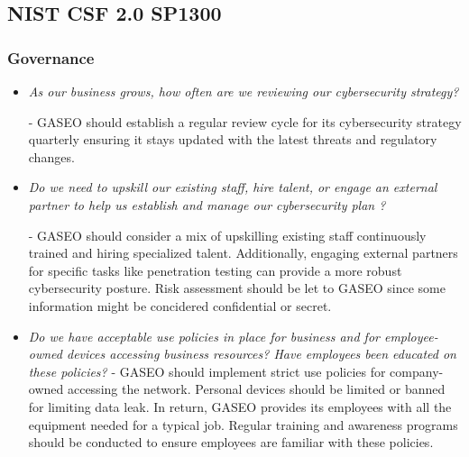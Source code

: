 \documentclass[12pt]{article}
\begin{document}
\subsection{NIST CSF 2.0 SP1300}

\subsubsection*{Governance}
 \begin{itemize}
     \item \textit{As our business grows, how often are we reviewing our cybersecurity strategy?}
     
     - GASEO should establish a regular review cycle for its cybersecurity strategy quarterly ensuring it stays updated with the latest threats and regulatory changes.
    
     \item \textit{Do we need to upskill our existing staff, hire talent, or engage an external partner
to help us establish and manage our cybersecurity plan ?}

    - GASEO should consider a mix of upskilling existing staff continuously trained and hiring specialized talent. Additionally, engaging external partners for specific tasks like penetration testing can provide a more robust cybersecurity posture. Risk assessment should be let to GASEO since some information might be concidered confidential or secret.
     \item \textit{Do we have acceptable use policies in place for business and for employee-owned
devices accessing business resources? Have employees been educated on these
policies?} 
    - GASEO should implement strict use policies for company-owned accessing the network. Personal devices should be limited or banned for limiting data leak. In return, GASEO provides its employees with all the equipment needed for a typical job. Regular training and awareness programs should be conducted to ensure employees are familiar with these policies.
 \end{itemize}
\end{document}
